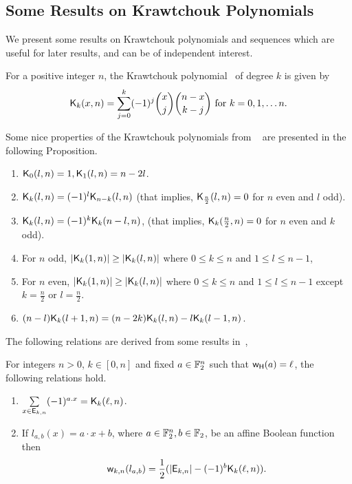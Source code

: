 \documentclass{llncs}
\begin{document}
\subsection{Some Results on Krawtchouk Polynomials}\label{ssec:KP}
We present some results on Krawtchouk polynomials and sequences which are useful for later results, and can be of independent interest.
\begin{definition}\label{def:Kr}
For a positive integer $n$, the Krawtchouk polynomial~\cite[Page $151$]{MacSlo78} of degree $k$ is given by 
\[\mathsf{K}_{k}(x,n)= \sum_{j=0}^{k} (-1)^j {x \choose j} {n-x \choose k-j} \text{ for } k = 0, 1, \ldots n.\]
\end{definition}
Some nice properties of the Krawtchouk polynomials from ~\cite[Proposition 4, Corollary 1]{DCC:DMS06} are presented in the following Proposition.
\begin{proposition}\label{prop:krawprop}
\begin{enumerate}
\item\label{itm1} $\mathsf{K}_{0}(l,n)=1, \mathsf{K}_{1}(l,n)= n-2l$.
\item\label{itm2} $\mathsf{K}_{k}(l,n) = (-1)^l \mathsf{K}_{n-k}(l,n)$ (that implies, $\mathsf{K}_{\frac{n}{2}}(l,n)=0$ for $n$ even and $l$ odd).
\item\label{itm3} $\mathsf{K}_{k}(l,n)= (-1)^k \mathsf{K}_{k}(n-l,n)$, (that implies, $\mathsf{K}_{k}(\frac{n}{2},n) = 0$ for $n$ even and $k$ odd).
\item\label{itm4} For $n$ odd, $|\mathsf{K}_{k}(1,n)| \geq |\mathsf{K}_{k}(l,n)|$ where $0 \leq k \leq n$ and $ 1 \leq l \leq n-1$,
\item\label{itm5} For $n$ even, $|\mathsf{K}_{k}(1,n)| \geq |\mathsf{K}_{k}(l,n)|$ where $0 \leq k \leq n$ and $1 \leq l \leq n-1$ except $k = \frac{n}{2}$ or $l = \frac{n}{2}$.
\item\label{itm6} $(n-l)\mathsf{K}_{k}(l+1,n) = (n-2k) \mathsf{K}_{k}(l,n) - l   \mathsf{K}_{k}(l-1,n)$.
\end{enumerate}
\end{proposition}
The following relations are derived from some results in~\cite{DCC:DMS06,DAM:GinMea22}, 
\begin{proposition} \label{prop:Kraw}
For integers $n > 0$, $k \in [0,n]$ and fixed $a \in \mathbb{F}_2^n$ such that $\mathsf{w_H}(a) = \ell$, the following relations hold.
\begin{enumerate}
\item $\sum\limits_{x \in \mathsf{E}_{k,n}} (-1)^{a.x} = \mathsf{K}_{k}(\ell,n)$.
\item If $l_{a,b}(x)= a \cdot x + b$, where $a \in \mathbb{F}_2^n, b \in \mathbb{F}_2$, be an affine Boolean function then 
\[\mathsf{w}_{k,n}(l_{a,b}) = \frac{1}{2} (|\mathsf{E}_{k,n}| - (-1)^b \mathsf{K}_{k}(\ell,n)).\]
\end{enumerate}
\end{proposition}
\end{document}
